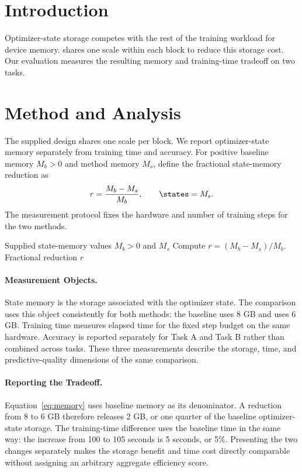 \section{Introduction}\label{sec:introduction}
Optimizer-state storage competes with the rest of the training workload for device memory.
\method{} shares one scale within each block to reduce this storage cost.
Our evaluation measures the resulting memory and training-time tradeoff on two tasks.

\section{Method and Analysis}\label{sec:method}
The supplied design shares one scale per block. We report optimizer-state memory separately from training time and accuracy.
For positive baseline memory $M_b>0$ and method memory $M_s$, define the fractional state-memory reduction as
\begin{equation}\label{eq:memory}
 r=\frac{M_b-M_s}{M_b},\qquad \states=M_s.
\end{equation}
The measurement protocol fixes the hardware and number of training steps for the two methods.

\begin{algorithm}[h]
\caption{Computing the Reported Storage Reduction}\label{alg:summary}
\begin{algorithmic}[1]
\REQUIRE Supplied state-memory values $M_b>0$ and $M_s$
\STATE Compute $r=(M_b-M_s)/M_b$.
\ENSURE Fractional reduction $r$
\end{algorithmic}
\end{algorithm}


\paragraph{Measurement Objects.}
State memory is the storage associated with the optimizer state.
The comparison uses this object consistently for both methods: the baseline uses 8 GB and \method{} uses 6 GB.
Training time measures elapsed time for the fixed step budget on the same hardware.
Accuracy is reported separately for Task A and Task B rather than combined across tasks.
These three measurements describe the storage, time, and predictive-quality dimensions of the same comparison.

\paragraph{Reporting the Tradeoff.}
Equation~\ref{eq:memory} uses baseline memory as its denominator.
A reduction from 8 to 6 GB therefore releases 2 GB, or one quarter of the baseline optimizer-state storage.
The training-time difference uses the baseline time in the same way: the increase from 100 to 105 seconds is 5 seconds, or 5\%.
Presenting the two changes separately makes the storage benefit and time cost directly comparable without assigning an arbitrary aggregate efficiency score.

